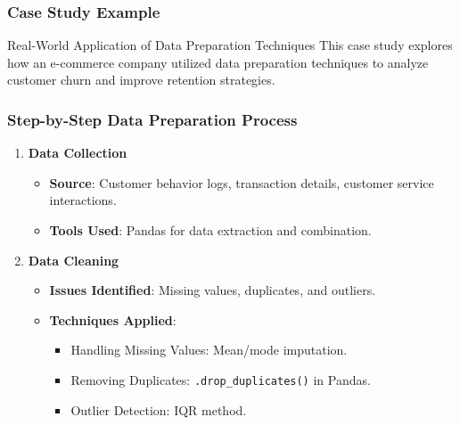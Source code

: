 \documentclass{beamer}
\begin{document}
\begin{frame}[fragile]
    \frametitle{Case Study Example}
    \begin{block}{Real-World Application of Data Preparation Techniques}
        This case study explores how an e-commerce company utilized data preparation techniques to analyze customer churn and improve retention strategies.
    \end{block}
\end{frame}

\begin{frame}[fragile]
    \frametitle{Step-by-Step Data Preparation Process}
    \begin{enumerate}
        \item \textbf{Data Collection}
        \begin{itemize}
            \item \textbf{Source}: Customer behavior logs, transaction details, customer service interactions.
            \item \textbf{Tools Used}: Pandas for data extraction and combination.
        \end{itemize}

        \item \textbf{Data Cleaning}
        \begin{itemize}
            \item \textbf{Issues Identified}: Missing values, duplicates, and outliers.
            \item \textbf{Techniques Applied}:
            \begin{itemize}
                \item Handling Missing Values: Mean/mode imputation.
                \item Removing Duplicates: \texttt{.drop\_duplicates()} in Pandas.
                \item Outlier Detection: IQR method.
            \end{itemize}
        \end{itemize}
    \end{enumerate}
\end{frame}
\end{document}
